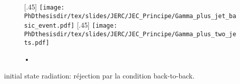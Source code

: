 \begin{figure}[h]
\centering
\subcaptionbox{\label{subfig-Gamma_plus_jet_basic_event}}[.45\textwidth]
{\texttt{[image: \\PhDthesisdir/tex/slides/JERC/JEC\_Principe/Gamma\_plus\_jet\_basic\_event.pdf]}}
\qquad
\subcaptionbox{\label{subfig-Gamma_plus_two_jets}}[.45\textwidth]
{\texttt{[image: \\PhDthesisdir/tex/slides/JERC/JEC\_Principe/Gamma\_plus\_two\_jets.pdf]}}
\caption{•}
\label{fig-Gamma_plus_jet_events}
\end{figure}

initial state radiation: réjection par la condition back-to-back.

